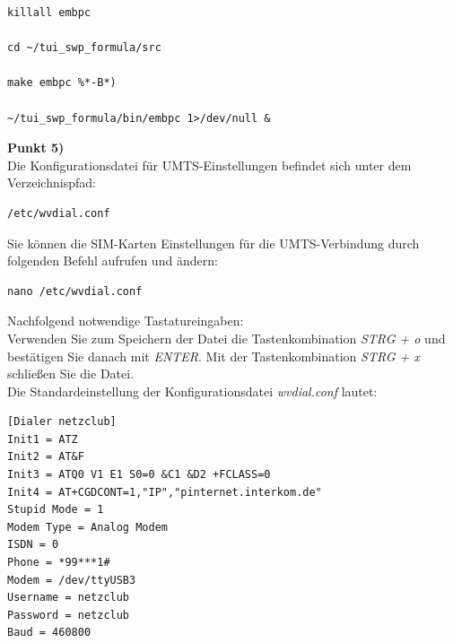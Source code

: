 \documentclass[fontsize = 12pt, paper = a4]{scrreprt}
\begin{document}
\newpage

\begin{lstlisting}[frame=single]
killall embpc

cd ~/tui_swp_formula/src
	
make embpc %*-B*)

~/tui_swp_formula/bin/embpc 1>/dev/null &
\end{lstlisting} 
\vspace*{-2mm}

\textbf{Punkt 5)} \\	

Die Konfigurationsdatei für UMTS-Einstellungen befindet sich unter dem Verzeichnispfad:

\vspace*{4mm}
\begin{lstlisting}[frame=single]
/etc/wvdial.conf
\end{lstlisting} 
\vspace*{-2mm}

Sie können die SIM-Karten Einstellungen für die UMTS-Verbindung durch folgenden Befehl aufrufen und ändern:

\vspace*{4mm}
\begin{lstlisting}[frame=single]
nano /etc/wvdial.conf
\end{lstlisting} 
\vspace*{-2mm}

Nachfolgend notwendige Tastatureingaben: \\

Verwenden Sie zum Speichern der Datei die Tastenkombination \textit{STRG + o} und bestätigen Sie danach mit \textit{ENTER}. Mit der Tastenkombination \textit{STRG + x} schließen Sie die Datei. \\

Die Standardeinstellung der Konfigurationsdatei \textit{wvdial.conf} lautet:

\vspace*{4mm}
\begin{lstlisting}[frame=single]
[Dialer netzclub]
Init1 = ATZ
Init2 = AT&F
Init3 = ATQ0 V1 E1 S0=0 &C1 &D2 +FCLASS=0
Init4 = AT+CGDCONT=1,"IP","pinternet.interkom.de"
Stupid Mode = 1
Modem Type = Analog Modem
ISDN = 0
Phone = *99***1#
Modem = /dev/ttyUSB3
Username = netzclub
Password = netzclub
Baud = 460800
\end{lstlisting} 
\vspace*{-2mm}
\end{document}
